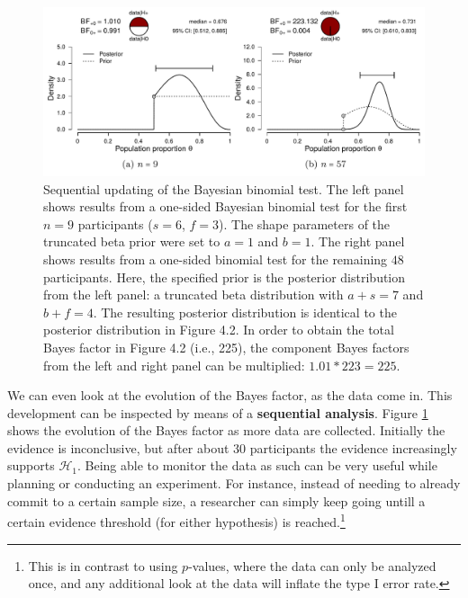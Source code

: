 \documentclass[
]{book}
\begin{document}
\begin{figure}

{\centering \includegraphics[width=1\linewidth]{Figures/BeerUpdatingPosteriorPlot} 

}

\caption{Sequential updating of the Bayesian binomial test. The left panel shows results from a one-sided Bayesian binomial test for the first $n = 9$ participants ($s = 6$, $f = 3$). The shape parameters of the truncated beta prior were set to $a = 1$ and $b = 1$. The right panel shows results from a one-sided binomial test for the remaining $48$ participants. Here, the specified prior is the posterior distribution from the left panel: a truncated beta distribution with $a+s = 7$ and $b+f = 4$.  The resulting posterior distribution is identical to the posterior distribution in Figure 4.2. In order to obtain the total Bayes factor in Figure 4.2 (i.e., 225), the component Bayes factors from the left and right panel can be multiplied: $1.01 * 223 = 225$.}\label{fig:jasp-beer-result-updating}
\end{figure}

We can even look at the evolution of the Bayes factor, as the data come in. This development can be inspected by means of a \textbf{sequential analysis}. Figure \ref{fig:jasp-beer-result-updating} shows the evolution of the Bayes factor as more data are collected. Initially the evidence is inconclusive, but after about \(30\) participants the evidence increasingly supports \(\mathcal{H}_1\). Being able to monitor the data as such can be very useful while planning or conducting an experiment. For instance, instead of needing to already commit to a certain sample size, a researcher can simply keep going untill a certain evidence threshold (for either hypothesis) is reached.\footnote{This is in contrast to using \(p\)-values, where the data can only be analyzed once, and any additional look at the data will inflate the type I error rate.}
\end{document}
